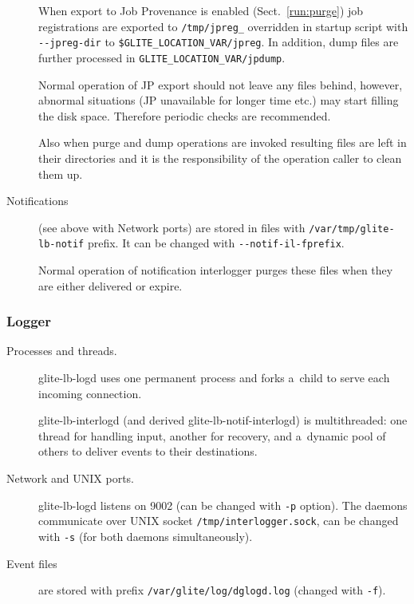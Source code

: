 \begin{description}
When export to Job Provenance is enabled (Sect.~\ref{run:purge})
job registrations are exported to \verb'/tmp/jpreg_'
overridden in startup script with \verb'--jpreg-dir' to \verb'$GLITE_LOCATION_VAR/jpreg'.
In addition, dump files are further processed in \verb'GLITE_LOCATION_VAR/jpdump'.

Normal operation of JP export should not leave any files behind,
however, abnormal situations (JP unavailable for longer time etc.)
may start filling the disk space. Therefore periodic checks are
recommended.

Also when purge and dump operations are invoked resulting files are left in their
directories and it is the responsibility of the operation caller to clean them up.

\item[Notifications]
(see above with Network ports) are stored in files with \verb'/var/tmp/glite-lb-notif'
prefix. It can be changed with \verb'--notif-il-fprefix'.

Normal operation of notification interlogger purges these files when
they are either delivered or expire.

\end{description}

\subsubsection{Logger}

\begin{description}
\item[Processes and threads.]
glite-lb-logd uses one permanent process and forks a~child to serve
each incoming connection.

glite-lb-interlogd (and derived glite-lb-notif-interlogd) is multithreaded:
one thread for handling input, another for recovery, and a~dynamic pool of others
to deliver events to their destinations.

\item[Network and UNIX ports.]
glite-lb-logd listens on 9002 (can be changed with \verb'-p' option).
The daemons communicate over UNIX socket \verb'/tmp/interlogger.sock',
can be changed with \verb'-s' (for both daemons simultaneously).

\item[Event files] are stored
with prefix \verb'/var/glite/log/dglogd.log' (changed with \verb'-f').


\end{description}

